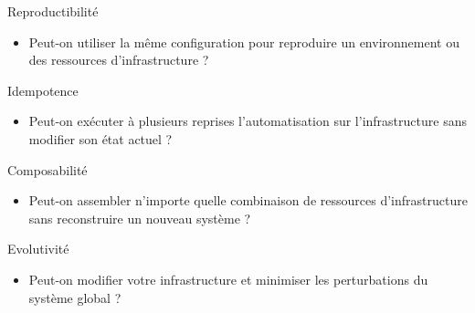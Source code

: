\documentclass[aspectratio=169,10pt]{beamer}
\begin{document}
\begin{frame}{Reproductibilité}
\begin{itemize}
  \item Peut-on utiliser la même configuration pour reproduire un environnement ou des ressources d'infrastructure ? 
\end{itemize}
\begin{center}

\end{center}
\end{frame}
\begin{frame}{Idempotence}
\begin{itemize}
  \item Peut-on  exécuter à plusieurs reprises l'automatisation sur l'infrastructure sans modifier son état actuel ? 
\end{itemize}
\begin{center}

\end{center}
\end{frame}
\begin{frame}{Composabilité}
\begin{itemize} 
  \item Peut-on assembler n’importe quelle combinaison de ressources d’infrastructure sans reconstruire un nouveau système ?
\end{itemize}
\begin{center}

\end{center}
\end{frame}
\begin{frame}{Evolutivité}
\begin{itemize}
  \item Peut-on modifier votre infrastructure et minimiser les perturbations du système global ?
\end{itemize}
\begin{center}

\end{center}
\end{frame}
\end{document}
